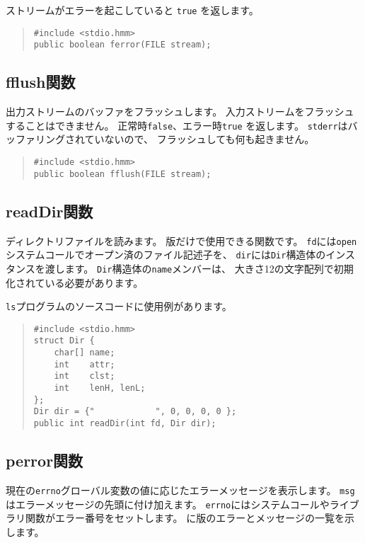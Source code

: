 ストリームがエラーを起こしていると \verb/true/ を返します。

\begin{quote}
\begin{verbatim}
#include <stdio.hmm>
public boolean ferror(FILE stream);
\end{verbatim}
\end{quote}

\subsection{fflush関数}

出力ストリームのバッファをフラッシュします。
入力ストリームをフラッシュすることはできません。
正常時\verb/false/、エラー時\verb/true/ を返します。
\verb/stderr/はバッファリングされていないので、
フラッシュしても何も起きません。

\begin{quote}
\begin{verbatim}
#include <stdio.hmm>
public boolean fflush(FILE stream);
\end{verbatim}
\end{quote}

\subsection{readDir関数}
\label{chap4:readDir}

ディレクトリファイルを読みます。
{\tacos}版だけで使用できる関数です。
\verb/fd/には\verb/open/システムコールでオープン済のファイル記述子を、
\verb/dir/には\verb/Dir/構造体のインスタンスを渡します。
\verb/Dir/構造体の\verb/name/メンバーは、
大きさ12の文字配列で初期化されている必要があります。

\verb/ls/プログラムのソースコードに使用例があります。

\begin{quote}
\begin{verbatim}
#include <stdio.hmm>
struct Dir {
    char[] name;
    int    attr;
    int    clst;
    int    lenH, lenL;
};
Dir dir = {"            ", 0, 0, 0, 0 };
public int readDir(int fd, Dir dir);
\end{verbatim}
\end{quote}

\subsection{perror関数}

現在の\verb/errno/グローバル変数の値に応じたエラーメッセージを表示します。
\verb/msg/はエラーメッセージの先頭に付け加えます。
\verb/errno/にはシステムコールやライブラリ関数がエラー番号をセットします。
に\tac 版のエラーとメッセージの一覧を示します。

